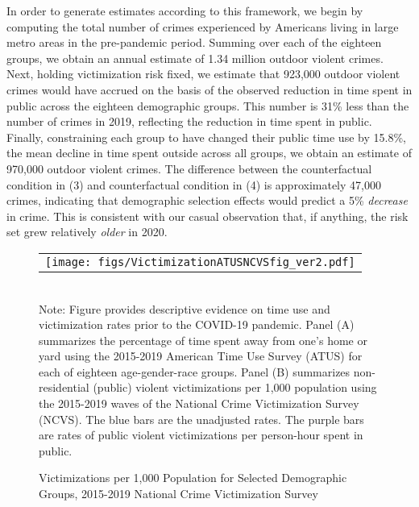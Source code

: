 In order to generate estimates according to this framework, we begin by computing the total number of crimes experienced by Americans living in large metro areas in the pre-pandemic period. Summing over each of the eighteen groups, we obtain an annual estimate of 1.34 million outdoor violent crimes. Next, holding victimization risk fixed, we estimate that 923,000 outdoor violent crimes would have accrued on the basis of the observed reduction in time spent in public across the eighteen demographic groups. This number is 31\% less than the number of crimes in 2019, reflecting the reduction in time spent in public. Finally, constraining each group to have changed their public time use by 15.8\%, the mean decline in time spent outside across all groups, we obtain an estimate of 970,000 outdoor violent crimes. The difference between the counterfactual condition in (3) and counterfactual condition in (4) is approximately 47,000 crimes, indicating that demographic selection effects would predict a 5\% \textit{decrease} in crime. This is consistent with our casual observation that, if anything, the risk set grew relatively \emph{older} in 2020. %


\begin{figure}
     \begin{center}
    \caption{Victimizations per 1,000 Population for Selected Demographic Groups, 2015-2019 National Crime Victimization Survey}
    \begin{tabular}{c}
    \hspace*{-3cm}
    \texttt{[image: figs/VictimizationATUSNCVSfig\_ver2.pdf]}
    \end{tabular}
    \label{fig:victimization_by_group2}
         \end{center}
        \vspace*{0mm}  \\ 
        \newline 
Note: Figure provides descriptive evidence on time use and victimization rates prior to the COVID-19 pandemic. Panel (A) summarizes the percentage of time spent away from one's home or yard using the 2015-2019 American Time Use Survey (ATUS) for each of eighteen age-gender-race groups.  Panel (B) summarizes non-residential (public) violent victimizations per 1,000 population using the 2015-2019 waves of the National Crime Victimization Survey (NCVS). The blue bars are the unadjusted rates. The purple bars are rates of public violent victimizations per person-hour spent in public.
\end{figure}


